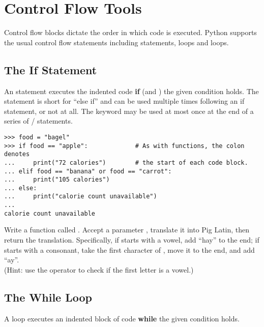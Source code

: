 \section*{Control Flow Tools} %

Control flow blocks dictate the order in which code is executed.
Python supports the usual control flow statements including  statements,  loops and  loops.

\subsection*{The If Statement} %

An  statement executes the indented code \textbf{if} (and ) the given condition holds.
The  statement is short for ``else if'' and can be used multiple times following an if statement, or not at all.
The  keyword may be used at most once at the end of a series of / statements.

\begin{lstlisting}
>>> food = "bagel"
>>> if food == "apple":             # As with functions, the colon denotes
...     print("72 calories")        # the start of each code block.
... elif food == "banana" or food == "carrot":
...     print("105 calories")
... else:
...     print("calorie count unavailable")
...
calorie count unavailable
\end{lstlisting}

\begin{problem} %
Write a function called .
Accept a parameter , translate it into Pig Latin, then return the translation.
Specifically, if  starts with a vowel, add ``hay'' to the end; if  starts with a consonant, take the first character of , move it to the end, and add ``ay''.
\\
(Hint: use the  operator to check if the first letter is a vowel.)
\end{problem}

\subsection*{The While Loop} %

A  loop executes an indented block of code \textbf{while} the given condition holds.

